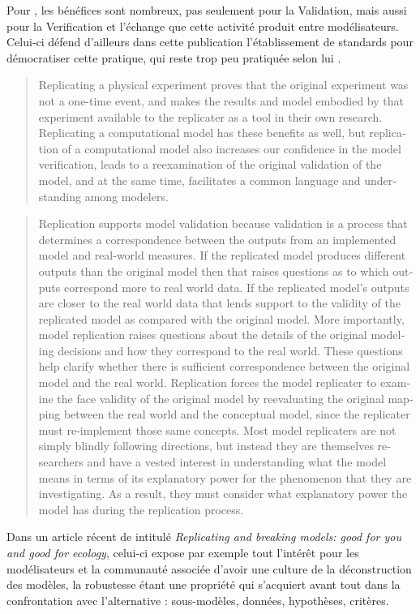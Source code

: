 Pour \textcite{Wilensky2007a}, les bénéfices sont nombreux, pas seulement pour la Validation, mais aussi pour la Verification  et l'échange que cette activité produit entre modélisateurs. Celui-ci défend d'ailleurs dans cette publication l'établissement de standards pour démocratiser cette pratique, qui reste trop peu pratiquée selon lui .

\foreignblockquote{english}[\cite{Wilensky2007a}]{Replicating a physical experiment proves that the original experiment was not a one-time event, and makes the results and model embodied by that experiment available to the replicater as a tool in their own research. Replicating a computational model has these benefits as well, but replication of a computational model also increases our confidence in the model verification, leads to a reexamination of the original validation of the model, and at the same time, facilitates a common language and understanding among modelers.}

\foreignblockquote{english}[\cite{Wilensky2007a}]{Replication supports model validation because validation is a process that determines a correspondence between the outputs from an implemented model and real-world measures. If the replicated model produces different outputs than the original model then that raises questions as to which outputs correspond more to real world data. If the replicated model's outputs are closer to the real world data that lends support to the validity of the replicated model as compared with the original model. More importantly, model replication raises questions about the details of the original modeling decisions and how they correspond to the real world. These questions help clarify whether there is sufficient correspondence between the original model and the real world. Replication forces the model replicater to examine the face validity of the original model by reevaluating the original mapping between the real world and the conceptual model, since the replicater must re-implement those same concepts. Most model replicaters are not simply blindly following directions, but instead they are themselves researchers and have a vested interest in understanding what the model means in terms of its explanatory power for the phenomenon that they are investigating. As a result, they must consider what explanatory power the model has during the replication process.}

Dans un article récent de \textcite{Thiele2015} intitulé \textit{Replicating and breaking models: good for you and good for ecology}, celui-ci expose par exemple tout l'intérêt pour les modélisateurs et la communauté associée d'avoir une culture de la déconstruction des modèles, la robustesse étant une propriété qui s'acquiert avant tout dans la confrontation avec l'alternative : sous-modèles, données, hypothèses, critères.

